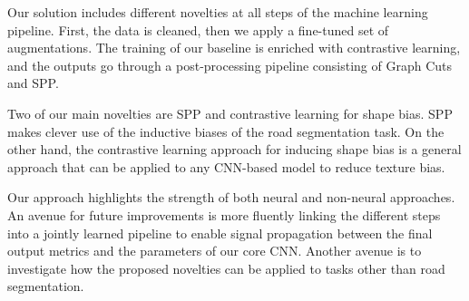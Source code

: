 Our solution includes different novelties at all steps of the machine learning pipeline.
First, the data is cleaned, then we apply a fine-tuned set of augmentations.
The training of our baseline is enriched with contrastive learning, and the outputs go through a post-processing pipeline consisting of Graph Cuts and SPP.

Two of our main novelties are SPP and contrastive learning for shape bias.
SPP makes clever use of the inductive biases of the road segmentation task.
On the other hand, the contrastive learning approach for inducing shape bias is a general approach that can be applied to any CNN-based model to reduce texture bias.

Our approach highlights the strength of both neural and non-neural approaches.
An avenue for future improvements is more fluently linking the different steps into a jointly learned pipeline to enable signal propagation between the final output metrics and the parameters of our core CNN.
Another avenue is to investigate how the proposed novelties can be applied to tasks other than road segmentation.